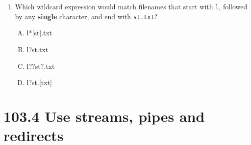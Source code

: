 \documentclass[a4paper]{report}
\begin{document}
\begin{enumerate}[1.]
    \item Which wildcard expression would match filenames that start with \texttt{l}, followed by any \textbf{single} character, and end with \texttt{st.txt}?  
    \begin{enumerate}[A)]
        \item l*[st].txt  
        \item l?st.txt  
        \item l??st?.txt  
        \item l?st.[txt]  
    \end{enumerate}

\end{enumerate}

\newpage
\section*{103.4 Use streams, pipes and redirects}

\newpage
\end{document}
